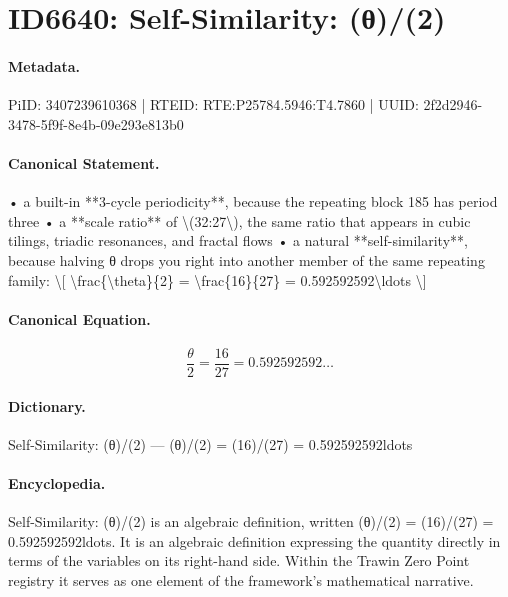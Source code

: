 \section*{ID6640: Self-Similarity: (θ)/(2)}
\paragraph{Metadata.}
PiID: 3407239610368 | RTEID: RTE:P25784.5946:T4.7860 | UUID: 2f2d2946-3478-5f9f-8e4b-09e293e813b0

\paragraph{Canonical Statement.}
• a built-in **3-cycle periodicity**, because the repeating block 185 has period three • a **scale ratio** of \textbackslash{}(32:27\textbackslash{}), the same ratio that appears in cubic tilings, triadic resonances, and fractal flows • a natural **self-similarity**, because halving θ drops you right into another member of the same repeating family: \textbackslash{}[ \textbackslash{}frac\{\textbackslash{}theta\}\{2\} = \textbackslash{}frac\{16\}\{27\} = 0.592592592\textbackslash{}ldots \textbackslash{}]

\paragraph{Canonical Equation.}
\[
\frac{\theta}{2} = \frac{16}{27} = 0.592592592\ldots
\]

\paragraph{Dictionary.}
Self-Similarity: (θ)/(2) — (θ)/(2) = (16)/(27) = 0.592592592ldots

\paragraph{Encyclopedia.}
Self-Similarity: (θ)/(2) is an algebraic definition, written (θ)/(2) = (16)/(27) = 0.592592592ldots. It is an algebraic definition expressing the quantity directly in terms of the variables on its right-hand side. Within the Trawin Zero Point registry it serves as one element of the framework's mathematical narrative.
